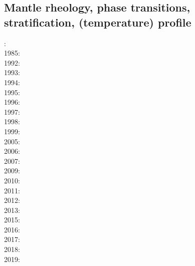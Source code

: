\subsection{Mantle rheology, phase transitions, stratification, (temperature) profile}

{\scriptsize
{}: \cite{yusb82}\cite{chri82}\\
1985: \cite{chyu85}\\
1992: \cite{zhyh92}\\
1993: \cite{tasg93}\cite{best93}\cite{kief93}\cite{styz93}\\
1994: \cite{vayv94}\cite{zhgu94b}\cite{styu94}\\
1995: \cite{zhyu95}\cite{chri95}\cite{scta95}\cite{tack95}\\
1996: \cite{pelt96}\cite{mitr96}\cite{tack96b}\\
1997: \cite{mifo97}\\
1998: \cite{cava98}\\
1999: \cite{sigh99}\cite{kehv99}\\
2005: \cite{hett05}\cite{nata05b}\\
2006: \cite{javd06}\cite{stca06}\\
2007: \cite{pazw07}\cite{mofm07}\cite{tanh07}\\
2009: \cite{natd09}\\
2010: \cite{kayy10}\\
2011: \cite{java11}\cite{faff11}\cite{nata11}\cite{vayj11}\\
2012: \cite{tack12}\cite{sato12}\cite{natd12}\\
2013: \cite{fakc13}\cite{taab13}\cite{jasv13}\\
2015: \cite{basn15}\\
2016: \cite{tiro16}\cite{beci16}\\
2017: \cite{vavs17}\cite{jasv17}\\
2018: \cite{mazh18}\\
2019: \cite{jasv19}
}

